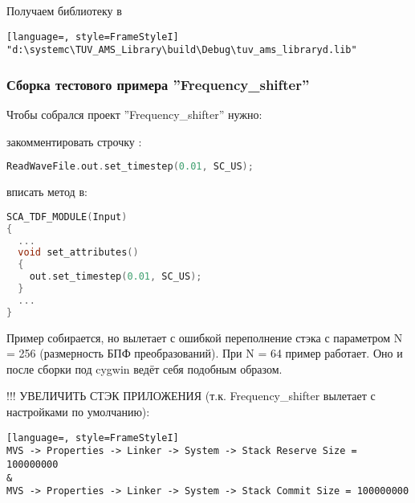 Получаем библиотеку в

\begin{lstlisting}[language=, style=FrameStyleI]
"d:\systemc\TUV_AMS_Library\build\Debug\tuv_ams_libraryd.lib"
\end{lstlisting}




\subsubsection{Сборка тестового примера ''Frequency\_shifter''}


Чтобы собрался проект ''Frequency\_shifter'' нужно:

закомментировать строчку :

\begin{lstlisting}[language=C++, style=FrameStyleI]
ReadWaveFile.out.set_timestep(0.01, SC_US);
\end{lstlisting}        

вписать метод в:
     
\begin{lstlisting}[language=C++, style=FrameStyleI]
SCA_TDF_MODULE(Input)
{
  ...
  void set_attributes()
  {
    out.set_timestep(0.01, SC_US);
  }
  ...
}
\end{lstlisting}     
     
     





Пример собирается, но вылетает с ошибкой переполнение стэка с параметром N = 256 (размерность БПФ преобразований). При N = 64 пример работает.  Оно и после сборки под cygwin ведёт себя подобным образом.



!!! УВЕЛИЧИТЬ СТЭК ПРИЛОЖЕНИЯ (т.к. Frequency\_shifter вылетает с настройками по умолчанию):

\begin{lstlisting}[language=, style=FrameStyleI]
MVS -> Properties -> Linker -> System -> Stack Reserve Size = 100000000
&
MVS -> Properties -> Linker -> System -> Stack Commit Size = 100000000
\end{lstlisting}













